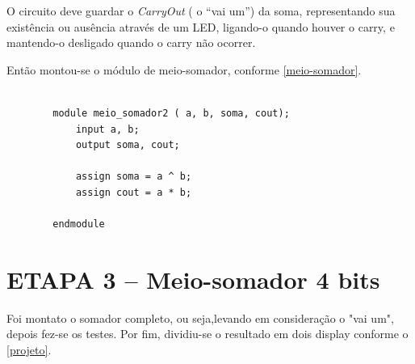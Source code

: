 		O circuito deve guardar o \textit{CarryOut} ( o “vai um”) da soma, representando sua existência
		ou ausência através de um LED, ligando-o quando houver o carry, e mantendo-o desligado quando
		o carry não ocorrer.

		Então montou-se o módulo de meio-somador, conforme \autoref{meio-somador}.
		\begin{lstlisting}[frame=L, caption={Módulo do meio somador.},label=meio-somador]  % Start your code-block

		module meio_somador2 ( a, b, soma, cout);
    		input a, b;
    		output soma, cout;

	 		assign soma = a ^ b;
    		assign cout = a * b;

		endmodule
		\end{lstlisting}

	\section{ETAPA 3 – Meio-somador 4 bits}
		Foi montato o somador completo, ou seja,levando em consideração o "vai um",
		 depois fez-se os testes.
		Por fim, dividiu-se o resultado em dois display conforme o \autoref{projeto}.
